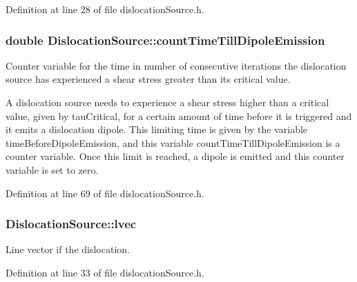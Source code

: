 \-Definition at line 28 of file dislocation\-Source.\-h.

\hypertarget{classDislocationSource_ac7dc0775009d826a114482fdf7d3db34}{
\subsubsection[{count\-Time\-Till\-Dipole\-Emission}]{\setlength{\rightskip}{0pt plus 5cm}double {\bf \-Dislocation\-Source\-::count\-Time\-Till\-Dipole\-Emission}}}\label{de/de3/classDislocationSource_ac7dc0775009d826a114482fdf7d3db34}


\-Counter variable for the time in number of consecutive iterations the dislocation source has experienced a shear stress greater than its critical value. 

\-A dislocation source needs to experience a shear stress higher than a critical value, given by tau\-Critical, for a certain amount of time before it is triggered and it emits a dislocation dipole. \-This limiting time is given by the variable time\-Before\-Dipole\-Emission, and this variable count\-Time\-Till\-Dipole\-Emission is a counter variable. \-Once this limit is reached, a dipole is emitted and this counter variable is set to zero. 

\-Definition at line 69 of file dislocation\-Source.\-h.

\hypertarget{classDislocationSource_a6a1ab6dc549236d2335a200e601781ea}{
\subsubsection[{lvec}]{ {\bf \-Dislocation\-Source\-::lvec}}}\label{de/de3/classDislocationSource_a6a1ab6dc549236d2335a200e601781ea}


\-Line vector if the dislocation. 



\-Definition at line 33 of file dislocation\-Source.\-h.

